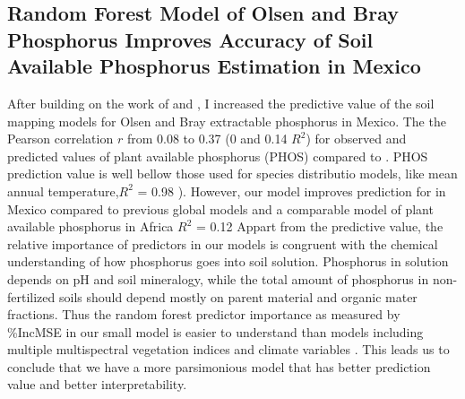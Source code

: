\subsection{Random Forest Model of Olsen and Bray Phosphorus Improves Accuracy of Soil Available Phosphorus Estimation in  Mexico}
After building on the work of \citep{hexianjin2022} and \citep{mcdowell2023}, I increased the predictive value of the soil mapping models for Olsen and Bray extractable phosphorus in  Mexico. The the Pearson correlation $r$ from 0.08 to 0.37 (0 and 0.14 $R^2$) for observed and predicted values of plant available phosphorus (PHOS) compared to \citep{mcdowell2023}. PHOS prediction value is well bellow those used for species distributio models, like  mean annual temperature,$R^2$ = 0.98 \citep{fick2017}).
However, our model improves prediction for in Mexico compared to previous global models \cite{mcdowell2023} and a comparable model of plant available phosphorus in  Africa $R^2$ = 0.12  \citep{hengl2017a} 
Appart from the predictive value,  the relative importance of predictors in our models is congruent with the chemical understanding of how phosphorus goes into soil solution.
Phosphorus in solution depends on pH and soil mineralogy, while the total amount of phosphorus in non-fertilized soils should depend mostly on parent material and organic mater fractions.
Thus the random forest predictor importance as measured by \%IncMSE in our small model is easier to understand than models including multiple multispectral vegetation indices and climate variables \citep{mcdowell2023}.
This leads us to conclude that we have a more parsimonious model that has better prediction value and better interpretability.




